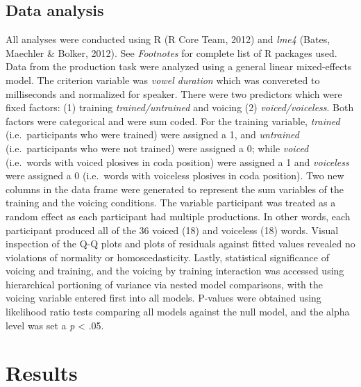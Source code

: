 \documentclass[man]{apa6}
\theoremstyle{definition}
\theoremstyle{definition}
\theoremstyle{definition}
\theoremstyle{remark}
\begin{document}
\subsection{Data analysis}\label{data-analysis}

All analyses were conducted using R (R Core Team, 2012) and \emph{lme4}
(Bates, Maechler \& Bolker, 2012). See \emph{Footnotes} for complete
list of R packages used. Data from the production task were analyzed
using a general linear mixed-effects model. The criterion variable was
\emph{vowel duration} which was convereted to milliseconds and
normalized for speaker. There were two predictors which were fixed
factors: (1) training \emph{trained/untrained} and voicing (2)
\emph{voiced/voiceless}. Both factors were categorical and were sum
coded. For the training variable, \emph{trained} (i.e.~participants who
were trained) were assigned a 1, and \emph{untrained} (i.e.~participants
who were not trained) were assigned a 0; while \emph{voiced} (i.e.~words
with voiced plosives in coda position) were assigned a 1 and
\emph{voiceless} were assigned a 0 (i.e.~words with voiceless plosives
in coda position). Two new columns in the data frame were generated to
represent the sum variables of the training and the voicing conditions.
The variable participant was treated as a random effect as each
participant had multiple productions. In other words, each participant
produced all of the 36 voiced (18) and voiceless (18) words. Visual
inspection of the Q-Q plots and plots of residuals against fitted values
revealed no violations of normality or homoscedasticity. Lastly,
statistical significance of voicing and training, and the voicing by
training interaction was accessed using hierarchical portioning of
variance via nested model comparisons, with the voicing variable entered
first into all models. P-values were obtained using likelihood ratio
tests comparing all models against the null model, and the alpha level
was set a \emph{p} \textless{} .05.

\section{Results}\label{results}
\end{document}
